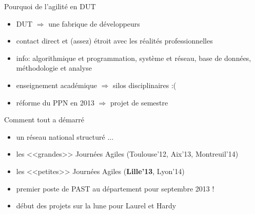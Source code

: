 \documentclass{beamer}
\begin{document}
\begin{frame}{Pourquoi de l'agilité en DUT}
   \begin{itemize}
    \item DUT $\Rightarrow$ une fabrique de développeurs
    \item contact direct et (assez) étroit avec les réalités professionnelles
    \item info: algorithmique et programmation, système et réseau, base de données, méthodologie et analyse
    \item enseignement académique $\Rightarrow$ silos disciplinaires :(
    \item réforme du PPN en 2013 $\Rightarrow$ projet de semestre
   \end{itemize}
\end{frame}

\begin{frame}{Comment tout a démarré}
   \begin{itemize}
     \item un réseau national structuré ...
     \item les <<grandes>> Journées Agiles (Toulouse'12, Aix'13, Montreuil'14)
     \item les <<petites>> Journées Agiles (\textbf{Lille'13}, Lyon'14)
     \item premier poste de PAST au département pour septembre 2013 !
     \item début des projets sur la lune pour Laurel et Hardy
   \end{itemize}
\end{frame}

{
\begin{frame}[plain]
\end{frame}
}
\end{document}
